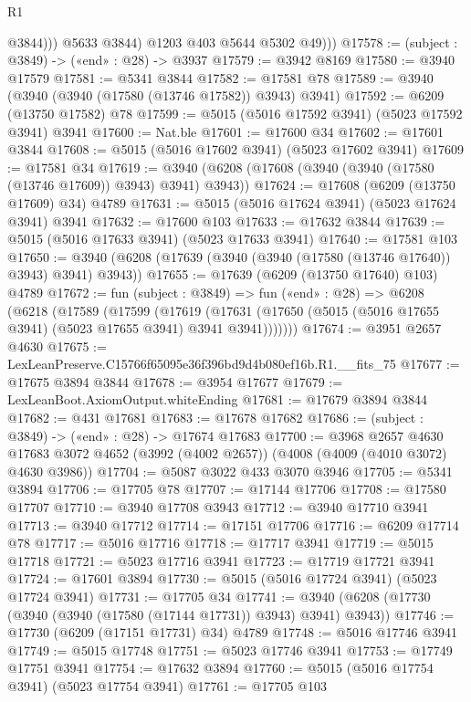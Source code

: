 \begin{lexlean}{R1}
\begin{coremodule}
                  @3844)))
            @5633
            @3844)
          @1203
          @403
          @5644
          @5302
          @49)))
@17578 := (subject : @3849) -> («end» : @28) -> @3937
@17579 := @3942 @8169
@17580 := @3940 @17579
@17581 := @5341 @3844
@17582 := @17581 @78
@17589 := @3940 (@3940 (@3940 (@17580 (@13746 @17582)) @3943) @3941)
@17592 := @6209 (@13750 @17582) @78
@17599 := @5015 (@5016 @17592 @3941) (@5023 @17592 @3941) @3941
@17600 := Nat.ble
@17601 := @17600 @34
@17602 := @17601 @3844
@17608 := @5015 (@5016 @17602 @3941) (@5023 @17602 @3941)
@17609 := @17581 @34
@17619 := @3940 (@6208 (@17608 (@3940 (@3940 (@17580 (@13746 @17609)) @3943) @3941) @3943))
@17624 := @17608 (@6209 (@13750 @17609) @34) @4789
@17631 := @5015 (@5016 @17624 @3941) (@5023 @17624 @3941) @3941
@17632 := @17600 @103
@17633 := @17632 @3844
@17639 := @5015 (@5016 @17633 @3941) (@5023 @17633 @3941)
@17640 := @17581 @103
@17650 := @3940 (@6208 (@17639 (@3940 (@3940 (@17580 (@13746 @17640)) @3943) @3941) @3943))
@17655 := @17639 (@6209 (@13750 @17640) @103) @4789
@17672 := fun (subject : @3849) =>
  fun («end» : @28) =>
  @6208
    (@6218
      (@17589
        (@17599
          (@17619
            (@17631 (@17650 (@5015 (@5016 @17655 @3941) (@5023 @17655 @3941) @3941 @3941)))))))
@17674 := @3951 @2657 @4630
@17675 := LexLeanPreserve.C15766f65095e36f396bd9d4b080ef16b.R1.__fits_75
@17677 := @17675 @3894 @3844
@17678 := @3954 @17677
@17679 := LexLeanBoot.AxiomOutput.whiteEnding
@17681 := @17679 @3894 @3844
@17682 := @431 @17681
@17683 := @17678 @17682
@17686 := (subject : @3849) -> («end» : @28) -> @17674 @17683
@17700 := @3968
    @2657
    @4630
    @17683
    @3072
    @4652
    (@3992 (@4002 @2657))
    (@4008 (@4009 (@4010 @3072) @4630 @3986))
@17704 := @5087 @3022 @433 @3070 @3946
@17705 := @5341 @3894
@17706 := @17705 @78
@17707 := @17144 @17706
@17708 := @17580 @17707
@17710 := @3940 @17708 @3943
@17712 := @3940 @17710 @3941
@17713 := @3940 @17712
@17714 := @17151 @17706
@17716 := @6209 @17714 @78
@17717 := @5016 @17716
@17718 := @17717 @3941
@17719 := @5015 @17718
@17721 := @5023 @17716 @3941
@17723 := @17719 @17721 @3941
@17724 := @17601 @3894
@17730 := @5015 (@5016 @17724 @3941) (@5023 @17724 @3941)
@17731 := @17705 @34
@17741 := @3940 (@6208 (@17730 (@3940 (@3940 (@17580 (@17144 @17731)) @3943) @3941) @3943))
@17746 := @17730 (@6209 (@17151 @17731) @34) @4789
@17748 := @5016 @17746 @3941
@17749 := @5015 @17748
@17751 := @5023 @17746 @3941
@17753 := @17749 @17751 @3941
@17754 := @17632 @3894
@17760 := @5015 (@5016 @17754 @3941) (@5023 @17754 @3941)
@17761 := @17705 @103

\end{coremodule}
\end{lexlean}
